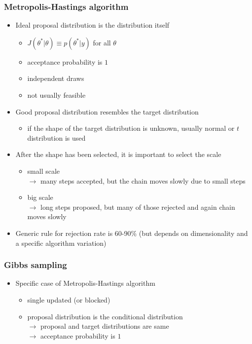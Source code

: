 \documentclass[10pt,handout]{beamer}
\begin{document}
\begin{frame}

\frametitle{ Metropolis-Hastings algorithm}

  \begin{itemize}
  \item Ideal proposal distribution is the distribution itself
    \begin{itemize}
    \item $J(\theta^{*}|\theta)\equiv p(\theta^{*}|y)$ for all
      $\theta$
    \item acceptance probability is $1$
    \item independent draws
    \item not usually feasible
    \end{itemize}
  \item<2-> Good proposal distribution resembles the target distribution
    \begin{itemize}
    \item if the shape of the target distribution is unknown, usually
      normal or $t$ distribution is used
    \end{itemize}
  \item<3-> After the shape has been selected, it is important to select the scale
    \begin{itemize}
    \item small scale \\$\rightarrow$ many steps accepted, but the chain moves slowly due to small steps
    \item big scale \\$\rightarrow$ long steps proposed, but many of
      those rejected and again chain moves slowly
    \end{itemize}
  \item<4-> Generic rule for rejection rate is 60-90\% (but depends on
    dimensionality and a specific algorithm variation)
\end{itemize}

\end{frame}

\begin{frame}

\frametitle{ Gibbs sampling}

  \begin{itemize}
  \item Specific case of Metropolis-Hastings algorithm
    \begin{itemize}
    \item single updated (or blocked)
    \item proposal distribution is the conditional distribution\\
      $\rightarrow$ proposal and target distributions are same\\
      $\rightarrow$ acceptance probability is $1$
    \end{itemize}
  \end{itemize}

\end{frame}
\end{document}
